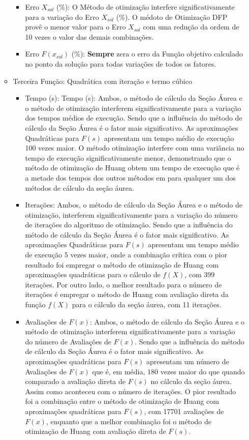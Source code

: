 \begin{itemize}
\begin{itemize}
\begin{itemize}
            \item {Erro $X_{sol}$ (\%):} O Método de otimização interfere significativamente para a variação do Erro $X_{sol}$ (\%). O médoto de Otimização DFP provê o menor valor para o Erro $X_{sol}$ com uma redução da ordem de 10 vezes o valor das demais combinações.
            \item {Erro $F(x_{sol})$ (\%):} \textbf{Sempre} zera o erro da Função objetivo calculado no ponto da solução para todas variações de todos os fatores. 
        \end{itemize}   
        \item Terceira Função: Quadrática com iteração e termo cúbico
        \begin{itemize}
        \item {Tempo (s):} {Tempo (s):} Ambos, o método de cálculo da Seção Áurea e o método de otimização interferem significativamente para a variação dos tempos médios de execução. Sendo que a influência do método de cálculo da Seção Áurea é o fator mais significativo. As aproximações Quadráticas para $F(s)$ apresentam um tempo médio de execução 100 vezes maior. O método otimização interfere com uma variância no tempo de execução significativamente menor, demonstrando que o método de otimização de Huang obtem um tempo de execução que é a metade dos tempos dos outros métodos em para qualquer um dos métodos de cálculo da seção áurea.
        \item {Iterações:}  Ambos, o método de cálculo da Seção Áurea e o método de otimização, interferem significativamente para a variação do número de iterações do algoritmo de otimização. Sendo que a influência do método de cálculo da Seção Áurea é o fator mais significativo. As aproximações Quadráticas para $F(s)$ apresentam um tempo médio de execução 5 vezes maior, onde a combinação crítica com o pior resultado foi empregar o método de otimização de Huang com aproximações quadráticas para o cálculo de $f(X)$, com 399 iterações. Por outro lado, o melhor resultado para o número de iterações é empregar o método de Huang com avaliação direta da função $f(X)$ para o cálculo da seção áurea, com 11 iterações.
        \item {Avaliações de $F(x)$:} Ambos, o método de cálculo da Seção Áurea e o método de otimização interferem significativamente para a variação do número de Avaliações de $F(x)$. Sendo que a influência do método de cálculo da Seção Áurea é o fator mais significativo. As aproximações quadráticas para $F(s)$ apresentam um número de Avaliações de $F(x)$ que é, em média, 180 vezes maior do que quando comparado a avaliação direta de $F(s)$ no cálculo da seção áurea. Assim como aconteceu com o número de iterações. O pior resultado foi a combinação entre o método de otimização de Huang com aproximações quadráticas para $F(s)$, com 17701 avaliações de $F(x)$, enquanto que a melhor combinação foi o método de otimização de Huang com avaliação direta de $F(s)$.        

\end{itemize}
\end{itemize}
\end{itemize}
